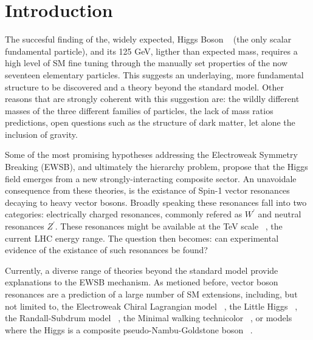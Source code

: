 \section{Introduction}

The succesful finding of the, widely expected, Higgs Boson ~\cite{higgsPaperCMS,higgsPaperATLAS}
(the only scalar fundamental particle), and its 125 GeV, ligther than expected mass,
requires a high level of SM fine tuning through the manually set properties
of the now seventeen elementary particles.
This suggests an underlaying, more fundamental structure to be discovered and
a theory beyond the standard model. Other
reasons that are strongly coherent with this suggestion are: the wildly
different masses of the three different families of particles, the lack of
mass ratios predictions, open questions such as the structure of dark matter,
let alone the inclusion of gravity.

Some of the most promising hypotheses addressing the Electroweak Symmetry
Breaking (EWSB), and ultimately the hierarchy problem, propose that the Higgs field
emerges from a new strongly-interacting composite sector. An unavoidale
consequence from these theories, is the existance of Spin-1 vector resonances
decaying to heavy vector bosons.  Broadly speaking these resonances
fall into  two categories: electrically
charged resonances, commonly refered as $W^{\prime}$ and
neutral resonances $Z^{\prime}$. These resonances might be available at the TeV
scale ~\cite{tevscale2014}, the current LHC energy range. The question then becomes:
can experimental evidence of the existance of such resonances be found?

Currently, a diverse range of theories
beyond the standard model provide explanations to the EWSB mechanism. As
metioned before, vector boson resonances are a prediction of a large number
of SM extensions, including, but not limited to, the Electroweak Chiral
Lagrangian model ~\cite{echl2017}, the Little Higgs
~\cite{littlehiggs2007}, the Randall-Subdrum  model ~\cite{randall1999}, the
Minimal walking technicolor ~\cite{technicolor2007}, or models where the Higgs
is a composite pseudo-Nambu-Goldstone boson ~\cite{composite2016}.

